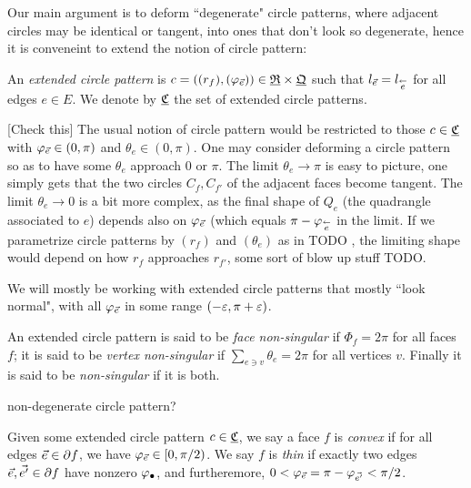 Our main argument is to deform ``degenerate" circle patterns,
where adjacent circles may
be identical or tangent, into ones that don't look so degenerate,
hence it is conveneint to extend the notion of circle pattern:

\begin{definition}
An \emph{extended circle pattern} is
$c = ((r_f), (\varphi_{\vec{e}})) \in {\underline{\mathfrak{R}}} \times {\underline{\mathfrak{Q}}}$
such that $l_{\vec{e}} = l_{\overset{\leftarrow}{e}}$ for all edges $e\in E$. We denote by
${\underline{\mathfrak{C}}}$ the set of extended circle patterns.
\end{definition}




[Check this] The usual notion of circle pattern would be restricted to those $c\in {\underline{\mathfrak{C}}}$
with $\varphi_{\vec{e}} \in (0,\pi)$ and $\theta_e \in (0,\pi)$.
One may consider deforming a circle pattern so as to have some $\theta_e$ approach 0 or $\pi$.
The limit $\theta_e \to \pi$ is easy to picture, one simply gets that the two circles
$C_f, C_{f'}$ of the adjacent faces become tangent. The limit $\theta_e \to 0$
is a bit more complex, as the final shape of $Q_e$ (the quadrangle associated to $e$)
depends also on $\varphi_{\vec{e}}$ (which equals $\pi - \varphi_{\overset{\leftarrow}{e}}$ in the limit.
If we parametrize circle patterns by $(r_f)$ and $(\theta_e)$ as in TODO ,
the limiting shape would depend on how $r_f$ approaches $r_{f'}$,
some sort of blow up stuff TODO.


We will mostly be working with extended circle patterns that mostly ``look normal",
with all $\varphi_{\vec{e}}$ in some range $(-\varepsilon, \pi + \varepsilon)$.

\begin{definition}
An extended circle pattern is said to be \emph{face non-singular}
if $\Phi_f = 2\pi$ for all faces $f$; it is said to be \emph{vertex non-singular}
if $\sum_{e \ni v} \theta_e = 2\pi$ for all vertices $v$.
Finally it is said to be \emph{non-singular} if it is both.
\end{definition}

non-degenerate circle pattern?


\begin{definition}
Given some extended circle pattern $c \in {\underline{\mathfrak{C}}}$,
we say a face $f$ is \emph{convex} if for all edges $\vec{e} \in \partial f$,
we have $\varphi_{\vec{e}} \in [0,\pi/2)$.
We say $f$ is \emph{thin} if exactly two edges $\vec{e}, \vec{e'} \in \partial f$
have nonzero $\varphi_{\bullet}$, and furtheremore,
	$0 < \varphi_{\vec{e}} = \pi - \varphi_{\vec{e'}} < \pi/2$.
\end{definition}

